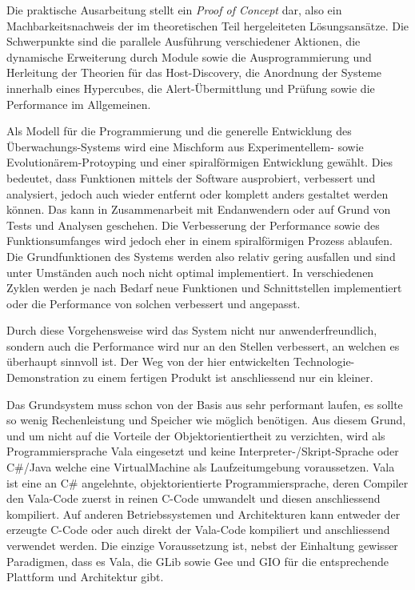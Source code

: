 
Die praktische Ausarbeitung stellt ein \textit{Proof of Concept} dar, also ein Machbarkeitsnachweis der im theoretischen Teil hergeleiteten L\"osungsans\"atze. Die Schwerpunkte sind die parallele Ausf\"uhrung verschiedener Aktionen, die dynamische Erweiterung durch Module sowie die Ausprogrammierung und Herleitung der Theorien f\"ur das Host-Discovery, die Anordnung der Systeme innerhalb eines Hypercubes, die Alert-\"Ubermittlung und Pr\"ufung sowie die Performance im Allgemeinen.

Als Modell f\"ur die Programmierung und die generelle Entwicklung des \"Uberwachungs-Systems wird eine Mischform aus Experimentellem- sowie Evolution\"arem-Protoyping und einer spiralf\"ormigen Entwicklung gew\"ahlt. Dies bedeutet, dass Funktionen mittels der Software ausprobiert, verbessert und analysiert, jedoch auch wieder entfernt oder komplett anders gestaltet werden k\"onnen. Das kann in Zusammenarbeit mit Endanwendern oder auf Grund von Tests und Analysen geschehen. Die Verbesserung der Performance sowie des Funktionsumfanges wird jedoch eher in einem spiralf\"ormigen Prozess ablaufen. Die Grundfunktionen des Systems werden also relativ gering ausfallen und sind unter Umst\"anden auch noch nicht optimal implementiert. In verschiedenen Zyklen werden je nach Bedarf neue Funktionen und Schnittstellen implementiert oder die Performance von solchen verbessert und angepasst.

Durch diese Vorgehensweise wird das System nicht nur anwenderfreundlich, sondern auch die Performance wird nur an den Stellen verbessert, an welchen es \"uberhaupt sinnvoll ist. Der Weg von der hier entwickelten Technologie-Demonstration zu einem fertigen Produkt ist anschliessend nur ein kleiner.

Das Grundsystem muss schon von der Basis aus sehr performant laufen, es sollte so wenig Rechenleistung und Speicher wie m\"oglich ben\"otigen. Aus diesem Grund, und um nicht auf die Vorteile der Objektorientiertheit zu verzichten, wird als Programmiersprache Vala\cite{vala} eingesetzt und keine Interpreter-/Skript-Sprache oder C\#/Java welche eine VirtualMachine als Laufzeitumgebung voraussetzen. Vala ist eine an C\# angelehnte, objektorientierte Programmiersprache, deren Compiler den Vala-Code zuerst in reinen C-Code umwandelt und diesen anschliessend kompiliert. Auf anderen Betriebssystemen und Architekturen kann entweder der erzeugte C-Code oder auch direkt der Vala-Code kompiliert und anschliessend verwendet werden. Die einzige Voraussetzung ist, nebst der Einhaltung gewisser Paradigmen, dass es Vala, die GLib\cite{glib} sowie Gee\cite{gee} und GIO\cite{gio} f\"ur die entsprechende Plattform und Architektur gibt.


